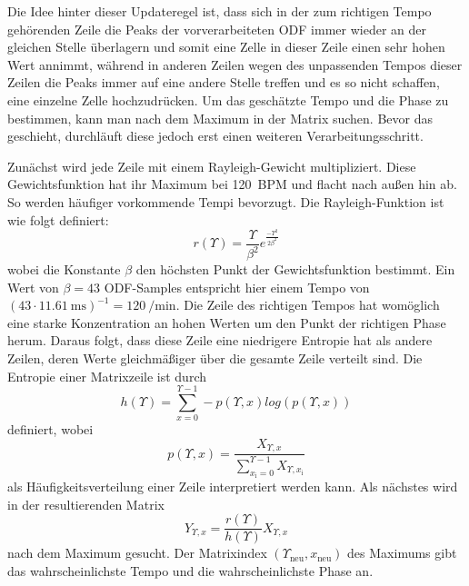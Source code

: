 {{{			%
			Die Idee hinter dieser Updateregel ist,
				dass sich in der zum richtigen Tempo gehörenden Zeile
				die Peaks der vorverarbeiteten ODF immer wieder an der gleichen Stelle überlagern
				und somit eine Zelle in dieser Zeile einen sehr hohen Wert annimmt,
				während in anderen Zeilen
				wegen des unpassenden Tempos dieser Zeilen
				die Peaks immer auf eine andere Stelle treffen
				und es so nicht schaffen,
				eine einzelne Zelle hochzudrücken.
			Um das geschätzte Tempo und die Phase zu bestimmen,
				kann man nach dem Maximum in der Matrix suchen.
			Bevor das geschieht,
				durchläuft diese jedoch erst einen weiteren Verarbeitungsschritt.

			Zunächst wird jede Zeile mit einem Rayleigh-Gewicht multipliziert.
			Diese Gewichtsfunktion hat ihr Maximum bei \SI{120}{\ac{BPM}} und flacht nach au{\ss}en hin ab.
			So werden häufiger vorkommende Tempi bevorzugt.
			Die Rayleigh-Funktion ist wie folgt definiert:
			\begin{equation}
				r(\Upsilon) = \frac{\Upsilon}{\beta^2}e^{\frac{-\Upsilon^2}{2\beta^2}}
			\end{equation}
			wobei die Konstante $\beta$ den höchsten Punkt der Gewichtsfunktion bestimmt.
			Ein Wert von $\beta = 43$ ODF-Samples entspricht hier einem Tempo von
				$(43 \cdot \SI{11.61}{\milli\second})^{-1} = \SI{120}{\per\minute}$.
			Die Zeile des richtigen Tempos hat womöglich eine starke Konzentration an hohen Werten um den Punkt der richtigen Phase herum.
			Daraus folgt,
				dass diese Zeile eine niedrigere Entropie hat als andere Zeilen,
				deren Werte gleichmä{\ss}iger über die gesamte Zeile verteilt sind.
			Die Entropie einer Matrixzeile ist durch
				\begin{equation}
					h(\Upsilon) = \sum_{x = 0}^{\Upsilon - 1} -p(\Upsilon, x) log(p(\Upsilon, x))
				\end{equation}
				definiert, wobei
				\begin{equation}
					p(\Upsilon, x) = \frac{X_{\Upsilon, x}}{\sum_{x_\text{i} = 0}^{\Upsilon - 1}X_{\Upsilon, x_\text{i}}}
				\end{equation}
				als Häufigkeitsverteilung einer Zeile interpretiert werden kann.
			Als nächstes wird in der resultierenden Matrix
				\begin{equation}
					Y_{\Upsilon, x} = \frac{r(\Upsilon)}{h(\Upsilon)}X_{\Upsilon, x}
				\end{equation}
				nach dem Maximum gesucht.
			Der Matrixindex $(\Upsilon_{\text{neu}}, x_{\text{neu}})$ des Maximums gibt das wahrscheinlichste Tempo und die wahrscheinlichste Phase an.

}}}
